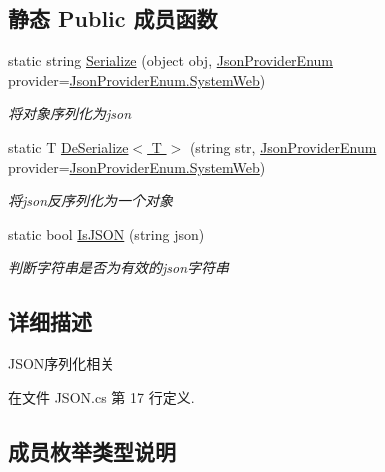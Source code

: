\subsection*{静态 Public 成员函数}
\begin{DoxyCompactItemize}
\item 
static string \hyperlink{class_x_c_l_net_tools_1_1_serialize_1_1_j_s_o_n_aa37e98ab010f59d7454506b78ca8902e}{Serialize} (object obj, \hyperlink{class_x_c_l_net_tools_1_1_serialize_1_1_j_s_o_n_acb00f7258e4dedfaa0cec15ce9335a31}{Json\+Provider\+Enum} provider=\hyperlink{class_x_c_l_net_tools_1_1_serialize_1_1_j_s_o_n_acb00f7258e4dedfaa0cec15ce9335a31a67a1b1b70420ea0e3be332a9dedcb83e}{Json\+Provider\+Enum.\+System\+Web})
\begin{DoxyCompactList}\small\item\em 将对象序列化为json \end{DoxyCompactList}\item 
static T \hyperlink{class_x_c_l_net_tools_1_1_serialize_1_1_j_s_o_n_a9c668a657dca5eb7529d0b7b6e1845a2}{De\+Serialize$<$ T $>$} (string str, \hyperlink{class_x_c_l_net_tools_1_1_serialize_1_1_j_s_o_n_acb00f7258e4dedfaa0cec15ce9335a31}{Json\+Provider\+Enum} provider=\hyperlink{class_x_c_l_net_tools_1_1_serialize_1_1_j_s_o_n_acb00f7258e4dedfaa0cec15ce9335a31a67a1b1b70420ea0e3be332a9dedcb83e}{Json\+Provider\+Enum.\+System\+Web})
\begin{DoxyCompactList}\small\item\em 将json反序列化为一个对象 \end{DoxyCompactList}\item 
static bool \hyperlink{class_x_c_l_net_tools_1_1_serialize_1_1_j_s_o_n_afa66781755a8dc2088b5f03cfd82d9e9}{Is\+J\+S\+ON} (string json)
\begin{DoxyCompactList}\small\item\em 判断字符串是否为有效的json字符串 \end{DoxyCompactList}\end{DoxyCompactItemize}


\subsection{详细描述}
J\+S\+O\+N序列化相关 



在文件 J\+S\+O\+N.\+cs 第 17 行定义.



\subsection{成员枚举类型说明}
\mbox{\label{class_x_c_l_net_tools_1_1_serialize_1_1_j_s_o_n_acb00f7258e4dedfaa0cec15ce9335a31}} 
